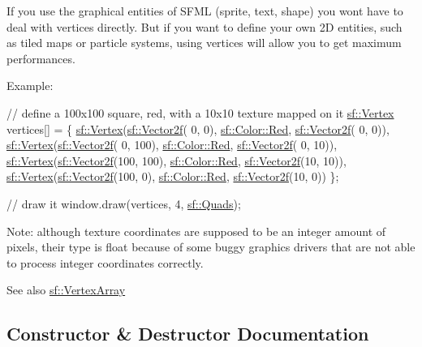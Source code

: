 If you use the graphical entities of S\+F\+ML (sprite, text, shape) you won\textquotesingle{}t have to deal with vertices directly. But if you want to define your own 2D entities, such as tiled maps or particle systems, using vertices will allow you to get maximum performances.

Example\+: 
\begin{DoxyCode}
\textcolor{comment}{// define a 100x100 square, red, with a 10x10 texture mapped on it}
\hyperlink{classsf_1_1_vertex}{sf::Vertex} vertices[] =
\{
    \hyperlink{classsf_1_1_vertex}{sf::Vertex}(\hyperlink{classsf_1_1_vector2}{sf::Vector2f}(  0,   0), \hyperlink{classsf_1_1_color_a127dbf55db9c07d0fa8f4bfcbb97594a}{sf::Color::Red}, 
      \hyperlink{classsf_1_1_vector2}{sf::Vector2f}( 0,  0)),
    \hyperlink{classsf_1_1_vertex}{sf::Vertex}(\hyperlink{classsf_1_1_vector2}{sf::Vector2f}(  0, 100), \hyperlink{classsf_1_1_color_a127dbf55db9c07d0fa8f4bfcbb97594a}{sf::Color::Red}, 
      \hyperlink{classsf_1_1_vector2}{sf::Vector2f}( 0, 10)),
    \hyperlink{classsf_1_1_vertex}{sf::Vertex}(\hyperlink{classsf_1_1_vector2}{sf::Vector2f}(100, 100), \hyperlink{classsf_1_1_color_a127dbf55db9c07d0fa8f4bfcbb97594a}{sf::Color::Red}, 
      \hyperlink{classsf_1_1_vector2}{sf::Vector2f}(10, 10)),
    \hyperlink{classsf_1_1_vertex}{sf::Vertex}(\hyperlink{classsf_1_1_vector2}{sf::Vector2f}(100,   0), \hyperlink{classsf_1_1_color_a127dbf55db9c07d0fa8f4bfcbb97594a}{sf::Color::Red}, 
      \hyperlink{classsf_1_1_vector2}{sf::Vector2f}(10,  0))
\};

\textcolor{comment}{// draw it}
window.draw(vertices, 4, \hyperlink{group__graphics_gga5ee56ac1339984909610713096283b1ba5041359b76b4bd3d3e6ef738826b8743}{sf::Quads});
\end{DoxyCode}


Note\+: although texture coordinates are supposed to be an integer amount of pixels, their type is float because of some buggy graphics drivers that are not able to process integer coordinates correctly.

\begin{DoxySeeAlso}{See also}
\hyperlink{classsf_1_1_vertex_array}{sf\+::\+Vertex\+Array} 
\end{DoxySeeAlso}


\subsection{Constructor \& Destructor Documentation}
\mbox{\label{classsf_1_1_vertex_a4dccc5c351b73b6fac169fe442535b40}} 
